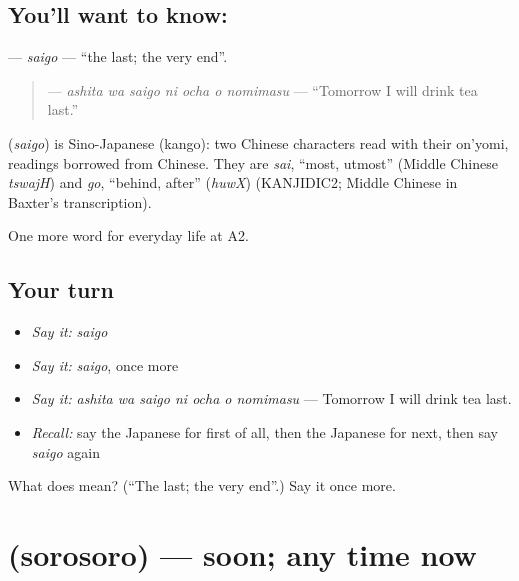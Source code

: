 \subsection*{You'll want to know: }
\textbf{} — \emph{saigo} — \textquotedblleft{}the last; the very end\textquotedblright{}.

\begin{quote}
\textbf{   } — \emph{ashita wa saigo ni ocha o nomimasu} — \textquotedblleft{}Tomorrow I will drink tea last.\textquotedblright{}
\end{quote}

\begin{cousinweb}
\textbf{} (\emph{saigo}) is Sino-Japanese (kango): two Chinese characters read with their on'yomi, readings borrowed from Chinese. They are \emph{sai}, \textquotedblleft{}most, utmost\textquotedblright{} (Middle Chinese \emph{tswajH}) and \emph{go}, \textquotedblleft{}behind, after\textquotedblright{} (\emph{huwX}) (KANJIDIC2; Middle Chinese in Baxter's transcription).
\end{cousinweb}

\begin{grammarlens}[title={What you've built}]
One more word for everyday life at A2.
\end{grammarlens}

\subsection*{Your turn}
\begin{itemize}
\raggedright
  \item \emph{Say it:} \emph{saigo}
  \item \emph{Say it:} \emph{saigo}, once more
  \item \emph{Say it:} \emph{ashita wa saigo ni ocha o nomimasu} — Tomorrow I will drink tea last.
  \item \emph{Recall:} say the Japanese for first of all, then the Japanese for next, then say \emph{saigo} again
\end{itemize}

\begin{tcolorbox}[breakable,colback=teal!4,colframe=teal!35!black,title={Before you move on}]
What does  mean? (\textquotedblleft{}The last; the very end\textquotedblright{}.) Say it once more.
\end{tcolorbox}
\section[\texorpdfstring{\ja{そろそろ} (sorosoro)}{そろそろ (sorosoro)}]{ (sorosoro) — soon; any time now}

